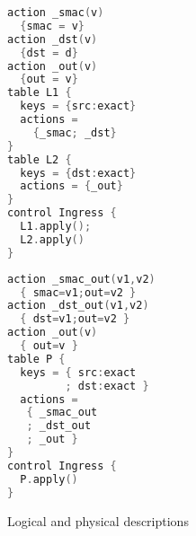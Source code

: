\begin{figure}[h]
\centering
\begin{minipage}[t]{.23\textwidth}
\centering
\begin{framed}\hspace{-.5em}
\begin{lstlisting}[basicstyle=\ttfamily\footnotesize,language=C, lineskip = 0em,numbersep=0pt,resetmargins=true, xleftmargin=-1em]
action _smac(v)
  {smac = v}
action _dst(v)
  {dst = d}
action _out(v)
  {out = v}
table L1 {
  keys = {src:exact}
  actions =
    {_smac; _dst}
}
table L2 {
  keys = {dst:exact}
  actions = {_out}
}
control Ingress {
  L1.apply();
  L2.apply()
}
\end{lstlisting}

\end{framed}
\end{minipage}
\begin{minipage}[t]{.23\textwidth}
\centering
\begin{framed}\hspace{-1em}
\begin{lstlisting}[basicstyle=\ttfamily\footnotesize,language=C, lineskip = 0em,numbersep=0pt,resetmargins=true, xleftmargin=-1em]
action _smac_out(v1,v2)
  { smac=v1;out=v2 }
action _dst_out(v1,v2)
  { dst=v1;out=v2 }
action _out(v)
  { out=v }
table P {
  keys = { src:exact
         ; dst:exact }
  actions =
   { _smac_out
   ; _dst_out
   ; _out }
}
control Ingress {
  P.apply()
}
\end{lstlisting}

\end{framed}
\end{minipage}

\label{fig:table-wp}
\caption{Logical and physical descriptions}
\end{figure}

